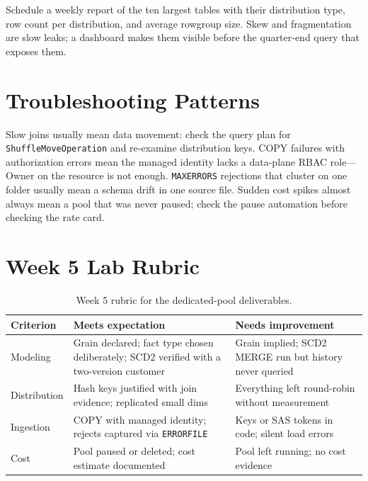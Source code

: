 \begin{tipbox}
Schedule a weekly report of the ten largest tables with their distribution type, row count per distribution, and average rowgroup size. Skew and fragmentation are slow leaks; a dashboard makes them visible before the quarter-end query that exposes them.
\end{tipbox}

\section{Troubleshooting Patterns}
Slow joins usually mean data movement: check the query plan for \texttt{ShuffleMoveOperation} and re-examine distribution keys. COPY failures with authorization errors mean the managed identity lacks a data-plane RBAC role---Owner on the resource is not enough. \texttt{MAXERRORS} rejections that cluster on one folder usually mean a schema drift in one source file. Sudden cost spikes almost always mean a pool that was never paused; check the pause automation before checking the rate card.

\section{Week 5 Lab Rubric}
\begin{table}[H]
\centering
\small
\begin{tabular}{@{}p{3.2cm}p{5.0cm}p{5.0cm}@{}}
\toprule
\textbf{Criterion} & \textbf{Meets expectation} & \textbf{Needs improvement} \\
\midrule
Modeling & Grain declared; fact type chosen deliberately; SCD2 verified with a two-version customer & Grain implied; SCD2 MERGE run but history never queried \\
Distribution & Hash keys justified with join evidence; replicated small dims & Everything left round-robin without measurement \\
Ingestion & COPY with managed identity; rejects captured via \texttt{ERRORFILE} & Keys or SAS tokens in code; silent load errors \\
Cost & Pool paused or deleted; cost estimate documented & Pool left running; no cost evidence \\
\bottomrule
\end{tabular}
\caption{Week 5 rubric for the dedicated-pool deliverables.}
\label{tab:ch5-rubric}
\end{table}

